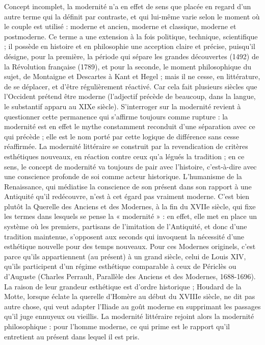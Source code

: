 Concept incomplet, la modernité n'a en effet de sens que placée en regard d'un autre terme qui la définit par contraste, et qui lui-même varie selon le moment où le couple est utilisé : moderne et ancien, moderne et classique, moderne et postmoderne. Ce terme a une extension à la fois politique, technique, scientifique ; il possède en histoire et en philosophie
une acception claire et précise, puisqu'il désigne, pour la première, la période qui sépare les grandes découvertes (1492) de la Révolution française (1789), et pour la seconde, le moment philosophique du sujet, de Montaigne et Descartes à Kant et Hegel ; mais il ne cesse, en littérature, de se déplacer, et d'être régulièrement réactivé. Car cela fait plusieurs siècles que l'Occident prétend être moderne (l'adjectif précède de beaucoup, dans la langue, le substantif apparu au XIXe siècle). S'interroger sur la modernité revient à questionner cette permanence qui s'affirme toujours comme rupture : la modernité est en effet le mythe constamment reconduit d'une séparation avec ce qui précède ; elle est le nom porté par cette logique de différence sans cesse réaffirmée.
La modernité littéraire se construit par la revendication de critères esthétiques nouveaux, en réaction contre ceux qu'a légués la tradition ; en ce sens, le concept de modernité va toujours de pair avec l'histoire, c'est-à-dire avec une conscience profonde de soi comme acteur historique. L'humanisme de la Renaissance, qui médiatise la conscience de son présent dans son rapport à une Antiquité qu'il redécouvre, n'est à cet égard pas vraiment moderne. C'est bien plutôt la Querelle des Anciens et des Modernes, à la fin du XVIIe siècle, qui fixe les termes dans lesquels se pense la « modernité » : en effet, elle met en place un système où les premiers, partisans de l'imitation de l'Antiquité, et donc d'une tradition maintenue, s'opposent aux seconds qui invoquent la nécessité d'une esthétique nouvelle pour des temps nouveaux. Pour ces Modernes originels, c'est parce qu'ils appartiennent (au présent) à un grand siècle, celui de Louis XIV, qu'ils participent d'un régime esthétique comparable à ceux de Périclès ou d'Auguste (Charles Perrault, Parallèle des Anciens et des Modernes, 1688-1696). La raison de leur grandeur esthétique est d'ordre historique ; Houdard de la Motte, lorsque éclate la querelle d'Homère au début du XVIIIe siècle, ne dit pas autre chose, qui veut adapter l'Iliade au goût moderne en supprimant les passages qu'il juge ennuyeux ou vieillis. La modernité littéraire rejoint alors la modernité philosophique : pour l'homme moderne, ce qui prime est le rapport qu'il entretient au présent dans lequel il est pris.
